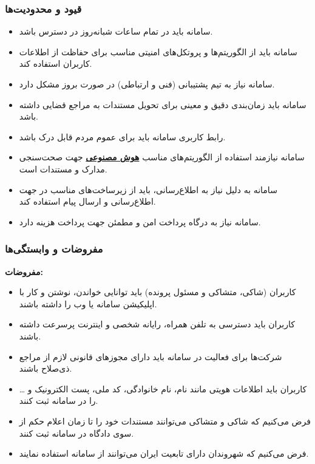 \documentclass[12pt,a4paper,oneside]{article}
\begin{document}
			\subsubsection{قیود و محدودیت‌ها}
			\begin{itemize}
				\item 
				سامانه باید در تمام ساعات شبانه‌روز در دسترس باشد.
			
				\item 
				سامانه باید از الگوریتم‌ها و پروتکل‌های امنیتی مناسب برای حفاظت از اطلاعات کاربران استفاده کند.
			
				\item 
				سامانه نیاز به تیم پشتیبانی (فنی و ارتباطی) در صورت بروز مشکل دارد.
			
				\item 
				سامانه باید زمان‌بندی دقیق و معینی برای تحویل مستندات به مراجع قضایی داشته باشد.
			
				\item 
				رابط کاربری سامانه باید برای عموم مردم قابل درک باشد.
			
				\item 
				سامانه نیازمند استفاده از الگوریتم‌های مناسب 
				\hyperref[ref:ai]{\textbf{هوش مصنوعی}}
				جهت صحت‌سنجی مدارک و مستندات است.
			
				\item 
				سامانه به دلیل نیاز به اطلاع‌رسانی، باید از زیرساخت‌های مناسب در جهت اطلاع‌رسانی و ارسال پیام استفاده کند.
			
				\item سامانه نیاز به درگاه پرداخت امن و مطمئن جهت پرداخت هزینه دارد.
			\end{itemize}
			
			\subsubsection{مفروضات و وابستگی‌ها}

			\textbf{مفروضات:}
			\begin{itemize}
				\item 
				کاربران (شاکی، متشاکی و مسئول پرونده) باید توانایی خواندن، نوشتن و کار با اپلیکیشن سامانه یا وب را داشته باشند.
			
				\item 
				کاربران باید دسترسی به تلفن همراه، رایانه شخصی و اینترنت پرسرعت داشته باشند.
			
				\item 
				شرکت‌ها برای فعالیت در سامانه باید دارای مجوزهای قانونی لازم از مراجع ذی‌صلاح باشند.
			
				\item 
				کاربران باید اطلاعات هویتی مانند نام، نام خانوادگی، کد ملی، پست الکترونیک و … را در سامانه ثبت کنند.
			
				\item 
				فرض می‌کنیم که شاکی و متشاکی می‌توانند مستندات خود را تا زمان اعلام حکم از سوی دادگاه در سامانه ثبت کنند.
			
				\item 
				فرض می‌کنیم که شهروندان دارای تابعیت ایران می‌توانند از سامانه استفاده نمایند.
			\end{itemize}
			
\end{document}
